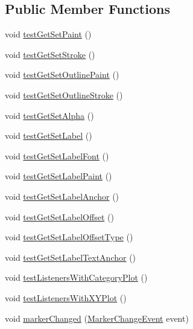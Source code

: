 \subsection*{Public Member Functions}
\begin{DoxyCompactItemize}
\item 
void \mbox{\hyperlink{classorg_1_1jfree_1_1chart_1_1plot_1_1_marker_test_a2a17239c221a825b300d806fc65760b0}{test\+Get\+Set\+Paint}} ()
\item 
void \mbox{\hyperlink{classorg_1_1jfree_1_1chart_1_1plot_1_1_marker_test_ae36303426f3a56b29b8c9101619f07ec}{test\+Get\+Set\+Stroke}} ()
\item 
void \mbox{\hyperlink{classorg_1_1jfree_1_1chart_1_1plot_1_1_marker_test_a33fbf1b83adf08e2d22991d8c28957ef}{test\+Get\+Set\+Outline\+Paint}} ()
\item 
void \mbox{\hyperlink{classorg_1_1jfree_1_1chart_1_1plot_1_1_marker_test_aa121557464ef4359e6cfcc3f6acc92cc}{test\+Get\+Set\+Outline\+Stroke}} ()
\item 
void \mbox{\hyperlink{classorg_1_1jfree_1_1chart_1_1plot_1_1_marker_test_a0a1103b817a2d48ef614d827903ac53d}{test\+Get\+Set\+Alpha}} ()
\item 
void \mbox{\hyperlink{classorg_1_1jfree_1_1chart_1_1plot_1_1_marker_test_ab50fb13bd0f1e4ae835868cafb69c7ae}{test\+Get\+Set\+Label}} ()
\item 
void \mbox{\hyperlink{classorg_1_1jfree_1_1chart_1_1plot_1_1_marker_test_a0f1d2e384edf630adb6720ed5d28033f}{test\+Get\+Set\+Label\+Font}} ()
\item 
void \mbox{\hyperlink{classorg_1_1jfree_1_1chart_1_1plot_1_1_marker_test_a10864099f82eece8f93ea80caeac2b25}{test\+Get\+Set\+Label\+Paint}} ()
\item 
void \mbox{\hyperlink{classorg_1_1jfree_1_1chart_1_1plot_1_1_marker_test_a108a4e1062e5fc3cc7f9802441149c9d}{test\+Get\+Set\+Label\+Anchor}} ()
\item 
void \mbox{\hyperlink{classorg_1_1jfree_1_1chart_1_1plot_1_1_marker_test_a0e700c50f277597353148494cb66c426}{test\+Get\+Set\+Label\+Offset}} ()
\item 
void \mbox{\hyperlink{classorg_1_1jfree_1_1chart_1_1plot_1_1_marker_test_a7e8b8fc9c8d0f38b2c3001dce22dab81}{test\+Get\+Set\+Label\+Offset\+Type}} ()
\item 
void \mbox{\hyperlink{classorg_1_1jfree_1_1chart_1_1plot_1_1_marker_test_a4d082a796fdca0fd61044c269eacd761}{test\+Get\+Set\+Label\+Text\+Anchor}} ()
\item 
void \mbox{\hyperlink{classorg_1_1jfree_1_1chart_1_1plot_1_1_marker_test_a94281d13a6debf6324f75b3f9b2cc00d}{test\+Listeners\+With\+Category\+Plot}} ()
\item 
void \mbox{\hyperlink{classorg_1_1jfree_1_1chart_1_1plot_1_1_marker_test_a5239bed5b870c5c56ce33777224d9320}{test\+Listeners\+With\+X\+Y\+Plot}} ()
\item 
void \mbox{\hyperlink{classorg_1_1jfree_1_1chart_1_1plot_1_1_marker_test_a0bc638bd786fdd5459342de17689a75e}{marker\+Changed}} (\mbox{\hyperlink{classorg_1_1jfree_1_1chart_1_1event_1_1_marker_change_event}{Marker\+Change\+Event}} event)
\end{DoxyCompactItemize}


